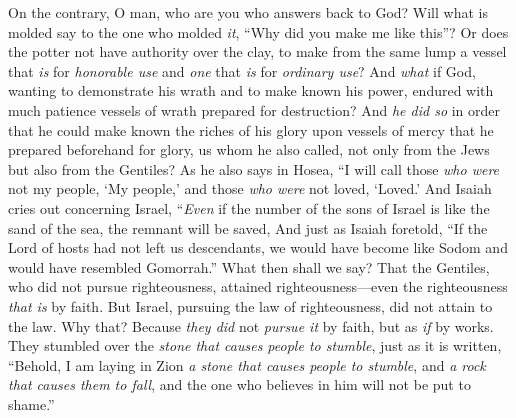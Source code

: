 \begin{biblechapter}
\verse On the contrary, O man, who are you who answers back to God? Will what is molded say to the one who molded \textit{it}, “Why did you make me like this”?
\verse Or does the potter not have authority over the clay, to make from the same lump a vessel that \textit{is} for \textit{honorable use} and \textit{one} that \textit{is} for \textit{ordinary use}?
\verse And \textit{what} if God, wanting to demonstrate his wrath and to make known his power, endured with much patience vessels of wrath prepared for destruction?
\verse And \textit{he did so} in order that he could make known the riches of his glory upon vessels of mercy that he prepared beforehand for glory,
\verse us whom he also called, not only from the Jews but also from the Gentiles?
\verse As he also says in Hosea,
\verse “I will call those \textit{who were} not my people, ‘My people,’ 
and those \textit{who were} not loved, ‘Loved.’
\verse And Isaiah cries out concerning Israel,
\verse “\textit{Even} if the number of the sons of Israel is like the sand of the sea, 
the remnant will be saved,
\verse And just as Isaiah foretold, “If the Lord of hosts had not left us descendants, 
we would have become like Sodom 
and would have resembled Gomorrah.”
\verse What then shall we say? That the Gentiles, who did not pursue righteousness, attained righteousness—even the righteousness \textit{that is} by faith.
\verse But Israel, pursuing the law of righteousness, did not attain to the law.
\verse Why that? Because \textit{they did} not \textit{pursue it} by faith, but as \textit{if} by works. They stumbled over the \textit{stone that causes people to stumble},
\verse just as it is written, “Behold, I am laying in Zion \textit{a stone that causes people to stumble}, 
and \textit{a rock that causes them to fall}, 
and the one who believes in him will not be put to shame.”
\end{biblechapter}

